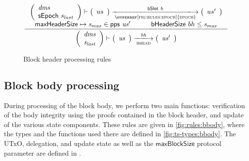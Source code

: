 \documentclass[11pt,a4paper]{article}
\newcommand{\var}[1]{\mathit{#1}}
\newcommand{\fun}[1]{\mathsf{#1}}
\newcommand{\pp}[1]{\mathsf{#1}}
\newcommand{\trans}[2]{\xlongrightarrow[\textsc{#1}]{#2}}
\newcommand{\maxblocksize}{\pp{maxBlockSize}}
\newcommand{\maxheadersize}{\pp{maxHeaderSize}}
\newcommand{\bhdrsizename}{bHeaderSize}
\newcommand{\bhdrsize}[1]{\fun{\bhdrsizename} ~ #1}
\begin{document}
\begin{figure}[ht]
  \begin{equation*}
    \inference
    {
      {\left(
        \begin{array}{l}
          \var{dms}\\
          \sepoch{s_{last}}\\
        \end{array}
      \right)}
      \vdash
      {\left(
          \begin{array}{l}
            us
          \end{array}
        \right)}
      \trans{\hyperref[fig:rules:epoch]{epoch}}{\bslot{b}}
      {\left(
          \begin{array}{l}
            us'
          \end{array}
        \right)}
      \\
      \\ \maxheadersize \mapsto \var{s_{max}} \in \fun{pps}~\var{us'} & \bhdrsize{bh} \leq \var{s_{max}}
    }
    {
      {\left(
        \begin{array}{l}
          \var{dms}\\
          \var{s_{last}}
        \end{array}
        \right)}
      \vdash
      \left(
        {\begin{array}{c}
           \var{us}
         \end{array}}
     \right)
     \trans{bhead}{\var{bh}}
     \left(
       {\begin{array}{c}
          \var{us'}
        \end{array}}
    \right)
  }
\end{equation*}
\caption{Block header processing rules}
\label{fig:rules:bhead}
\end{figure}

\clearpage

\subsection{Block body processing}

During processing of the block body, we perform two main functions:
verification of the body integrity using the proofs contained in the block
header, and update of the various state components. These rules are given in
\cref{fig:rules:bbody}, where the types and the functions used there are
defined in \cref{fig:ts-types:bbody}. The UTxO, delegation, and update state as
well as the $\maxblocksize{}$ protocol parameter are defined in
\cite{byron_ledger_spec}.
\end{document}

